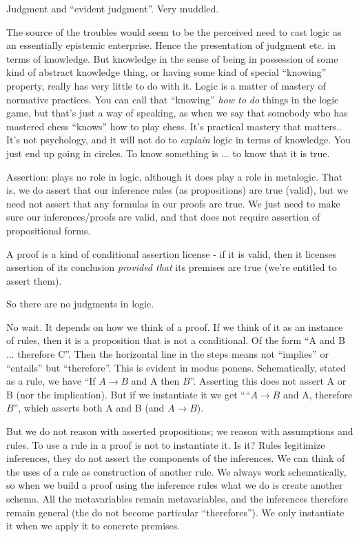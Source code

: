 \documentclass{article}
\begin{document}
Judgment and ``evident judgment''. Very muddled.

The source of the troubles would seem to be the perceived need to cast
logic as an essentially epistemic enterprise. Hence the presentation
of judgment etc. in terms of knowledge. But knowledge in the sense of
being in possession of some kind of abstract knowledge thing, or
having some kind of special ``knowing'' property, really has very
little to do with it. Logic is a matter of mastery of normative
practices. You can call that ``knowing'' \textit{how to do} things in
the logic game, but that's just a way of speaking, as when we say that
somebody who has mastered chess ``knows'' how to play chess. It's
practical mastery that matters.. It's not psychology, and it will not
do to \textit{explain} logic in terms of knowledge. You just end up
going in circles. To know something is ... to know that it is true.

Assertion: plays no role in logic, although it does play a role in
metalogic. That is, we do assert that our inference rules (as
propositions) are true (valid), but we need not assert that any
formulas in our proofs are true. We just need to make sure our
inferences/proofs are valid, and that does not require assertion of
propositional forms.

A proof is a kind of conditional assertion license - if it is valid,
then it licenses assertion of its conclusion \textit{provided that}
its premises are true (we're entitled to assert them).

So there are no judgments in logic.

No wait. It depends on how we think of a proof. If we think of it as
an instance of rules, then it is a proposition that is not a
conditional. Of the form ``A and B ... therefore C''. Then the
horizontal line in the steps means not ``implies'' or ``entails'' but
``therefore''. This is evident in modus ponens. Schematically, stated
as a rule, we have ``If \(A\rightarrow B\) and A then \(B\)''.
Asserting this does not assert A or B (nor the implication). But if we
instantiate it we get ````\(A\rightarrow B\) and A, therefore \(B\)'',
which asserts both A and B (and \(A\rightarrow B\)).

But we do not reason with asserted propositions; we reason with
assumptions and rules. To use a rule in a proof is not to instantiate
it. Is it? Rules legitimize inferences, they do not assert the
components of the inferences. We can think of the uses of a rule as
construction of another rule. We always work schematically, so when we
build a proof using the inference rules what we do is create another
schema. All the metavariables remain metavariables, and the inferences
therefore remain general (the do not become particular
``therefores''). We only instantiate it when we apply it to concrete
premises.
\end{document}
